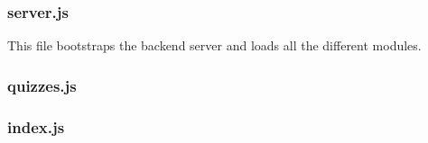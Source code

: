 \subsubsection{server.js} %
This file bootstraps the backend server and loads all the different modules.


\subsubsection{quizzes.js} %


\subsubsection{index.js} %

